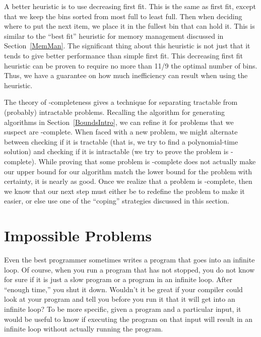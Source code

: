 A better heuristic is to use decreasing first fit.
This is the same as first fit, except that we keep the bins sorted
from most full to least full.
Then when deciding where to put the next item, we place it in the
fullest bin that can hold it.
This is similar to the ``best fit'' heuristic for memory management
discussed in Section~\ref{MemMan}.
The significant thing about this heuristic is not just that it tends
to give better performance than simple first fit.
This decreasing first fit heuristic 
can be proven to require no more than 11/9 the optimal number
of bins.
Thus, we have a guarantee on how much inefficiency can result when
using the heuristic.

The theory of \NP-completeness gives a technique for separating
tractable from (probably) intractable problems.
Recalling the algorithm for generating algorithms in
Section~\ref{BoundsIntro}, we can refine it for problems that we
suspect are \NP-complete.
When faced with a new problem, we might alternate between
checking if it is tractable (that is, we try to find a polynomial-time
solution) and checking if it is intractable (we try to prove the
problem is \NP-complete).
While proving that some problem is \NP-complete does not actually make
our upper bound for our algorithm match the lower bound for the
problem with certainty, it is nearly as good.
Once we realize that a problem is \NP-complete, then we know that our
next step must either be to redefine the problem to make it easier, or
else use one of the ``coping'' strategies discussed in this section.


\section{Impossible Problems}
\label{Computability}

Even the best programmer sometimes writes a program that goes into an
infinite loop.
Of course, when you run a program that has not stopped, you do not
know for sure if it is just a slow program or a program in an infinite
loop.
After ``enough time,'' you shut it down.
Wouldn't it be great if your compiler could look at your program and
tell you before you run it that it will get into an infinite loop?
To be more specific, given a program and a particular input, it would
be useful to know if executing the program on that input will result
in an infinite loop without actually running the program.

